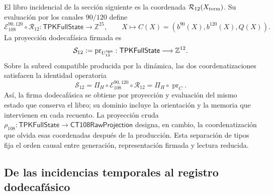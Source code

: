 El libro incidencial de la sección siguiente es la coordenada
\(\mathcal R_{12}(X_{\rm term})\). Su evaluación por los canales
\(90/120\) define
\[
 \mathcal E_{108}^{90,120}\circ\mathcal R_{12}:
 \mathsf{TPKFullState}\longrightarrow\mathbb Z^{25},
 \qquad
 X\longmapsto C(X)=(b^{90}(X),b^{120}(X),Q(X)).
\]
La proyección dodecafásica firmada es
\[
 \mathcal S_{12}:=\operatorname{pr}_{U_{12}^{\rm sgn}}:
 \mathsf{TPKFullState}\longrightarrow\mathbb Z^{12}.
\]
Sobre la subred compatible producida por la dinámica, las dos coordenatizaciones
satisfacen la identidad operatoria
\begin{equation}
 \mathcal S_{12}
 =\Pi_H\circ\mathcal E_{108}^{90,120}\circ\mathcal R_{12}
 =\Pi_H\circ\operatorname{pr}_{C}.
 \label{vi:dep:identidad-productor-e108}
\end{equation}
Así, la firma dodecafásica se obtiene por proyección y evaluación del mismo
estado que conserva el libro; su dominio incluye la orientación y la memoria
que intervienen en cada recuento. La proyección cruda
\(\rho_{108}:\mathsf{TPKFullState}\to\mathsf{CT108RawProjection}\)
designa, en cambio, la coordenatización que olvida esas coordenadas después de la
producción. Esta separación de tipos fija el orden causal entre generación,
representación firmada y lectura reducida.

\subsection{De las incidencias temporales al registro dodecafásico}
\label{vi:dep:registro}\label{subsec:k-registro-integral}

